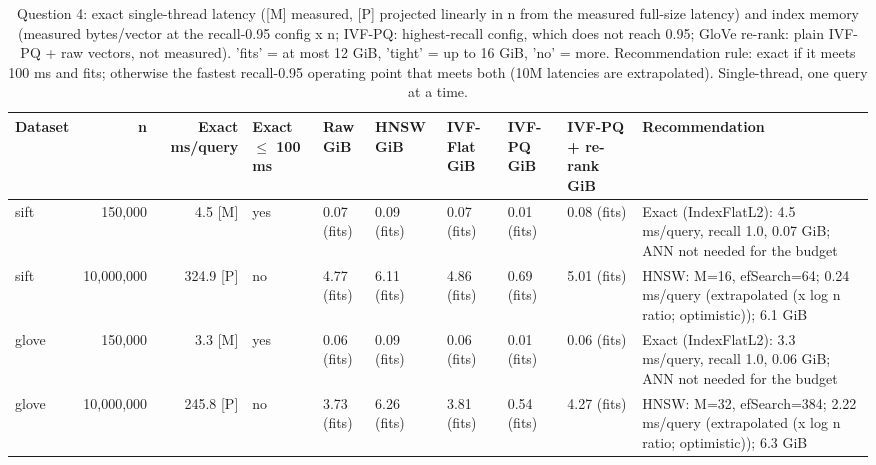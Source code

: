 \begin{table}[t]
\centering
\small
\begin{adjustbox}{max width=\linewidth}
\begin{tabular}{lrrllllllp{4.5cm}}
\toprule
Dataset & n & Exact ms/query & Exact $\leq$ 100 ms & Raw GiB & HNSW GiB & IVF-Flat GiB & IVF-PQ GiB & IVF-PQ + re-rank GiB & Recommendation \\
\midrule
sift & 150,000 & 4.5 [M] & yes & 0.07 (fits) & 0.09 (fits) & 0.07 (fits) & 0.01 (fits) & 0.08 (fits) & Exact (IndexFlatL2): 4.5 ms/query, recall 1.0, 0.07 GiB; ANN not needed for the budget \\
sift & 10,000,000 & 324.9 [P] & no & 4.77 (fits) & 6.11 (fits) & 4.86 (fits) & 0.69 (fits) & 5.01 (fits) & HNSW: M=16, efSearch=64; 0.24 ms/query (extrapolated (x log n ratio; optimistic)); 6.1 GiB \\
glove & 150,000 & 3.3 [M] & yes & 0.06 (fits) & 0.09 (fits) & 0.06 (fits) & 0.01 (fits) & 0.06 (fits) & Exact (IndexFlatL2): 3.3 ms/query, recall 1.0, 0.06 GiB; ANN not needed for the budget \\
glove & 10,000,000 & 245.8 [P] & no & 3.73 (fits) & 6.26 (fits) & 3.81 (fits) & 0.54 (fits) & 4.27 (fits) & HNSW: M=32, efSearch=384; 2.22 ms/query (extrapolated (x log n ratio; optimistic)); 6.3 GiB \\
\bottomrule
\end{tabular}
\end{adjustbox}
\caption{Question 4: exact single-thread latency ([M] measured, [P] projected linearly in n from the measured full-size latency) and index memory (measured bytes/vector at the recall-0.95 config x n; IVF-PQ: highest-recall config, which does not reach 0.95; GloVe re-rank: plain IVF-PQ + raw vectors, not measured). 'fits' = at most 12 GiB, 'tight' = up to 16 GiB, 'no' = more. Recommendation rule: exact if it meets 100 ms and fits; otherwise the fastest recall-0.95 operating point that meets both (10M latencies are extrapolated). Single-thread, one query at a time.}
\label{tab:q4}
\end{table}
